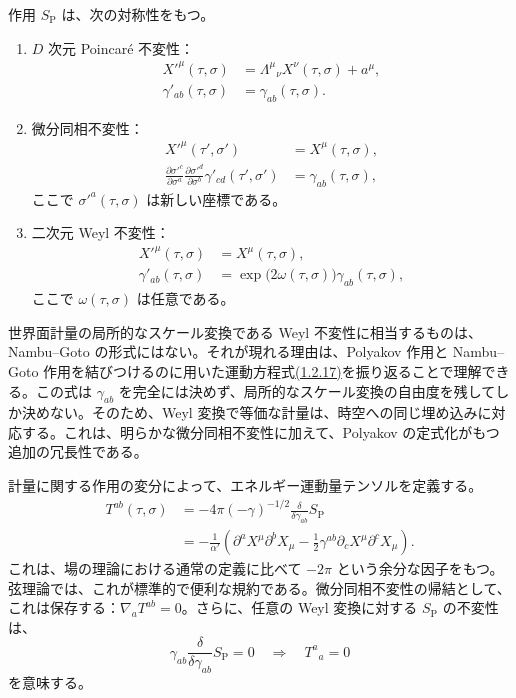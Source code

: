 作用 $S_{\mathrm P}$ は、次の対称性をもつ。
\begin{enumerate}
\item $D$ 次元 Poincaré 不変性：
\begin{equation}
\begin{aligned}
X'^\mu(\tau,\sigma)&=\Lambda^\mu{}_\nu X^\nu(\tau,\sigma)+a^\mu,\\
\gamma'_{ab}(\tau,\sigma)&=\gamma_{ab}(\tau,\sigma).
\end{aligned}
\tag{1.2.19}\label{eq:1.2.19}
\end{equation}
\item 微分同相不変性：
\begin{equation}
\begin{aligned}
X'^\mu(\tau',\sigma')&=X^\mu(\tau,\sigma),\\
\frac{\partial\sigma'^c}{\partial\sigma^a}
\frac{\partial\sigma'^d}{\partial\sigma^b}\gamma'_{cd}(\tau',\sigma')
&=\gamma_{ab}(\tau,\sigma),
\end{aligned}
\tag{1.2.20}\label{eq:1.2.20}
\end{equation}
ここで $\sigma'^a(\tau,\sigma)$ は新しい座標である。
\item 二次元 Weyl 不変性：
\begin{equation}
\begin{aligned}
X'^\mu(\tau,\sigma)&=X^\mu(\tau,\sigma),\\
\gamma'_{ab}(\tau,\sigma)&=\exp\bigl(2\omega(\tau,\sigma)\bigr)
\gamma_{ab}(\tau,\sigma),
\end{aligned}
\tag{1.2.21}\label{eq:1.2.21}
\end{equation}
ここで $\omega(\tau,\sigma)$ は任意である。
\end{enumerate}
世界面計量の局所的なスケール変換である Weyl 不変性に相当するものは、Nambu--Goto の形式にはない。それが現れる理由は、Polyakov 作用と Nambu--Goto 作用を結びつけるのに用いた運動方程式\hyperref[eq:1.2.17]{(1.2.17)}を振り返ることで理解できる。この式は $\gamma_{ab}$ を完全には決めず、局所的なスケール変換の自由度を残してしか決めない。そのため、Weyl 変換で等価な計量は、時空への同じ埋め込みに対応する。これは、明らかな微分同相不変性に加えて、Polyakov の定式化がもつ追加の冗長性である。

計量に関する作用の変分によって、エネルギー運動量テンソルを定義する。
\begin{equation}
\begin{aligned}
T^{ab}(\tau,\sigma)&=-4\pi(-\gamma)^{-1/2}
\frac{\delta}{\delta\gamma_{ab}}S_{\mathrm P}\\
&=-\frac{1}{\alpha'}\left(
\partial^aX^\mu\partial^bX_\mu
-\frac12\gamma^{ab}\partial_cX^\mu\partial^cX_\mu\right).
\end{aligned}
\tag{1.2.22}\label{eq:1.2.22}
\end{equation}
これは、場の理論における通常の定義に比べて $-2\pi$ という余分な因子をもつ。弦理論では、これが標準的で便利な規約である。微分同相不変性の帰結として、これは保存する：$\nabla_aT^{ab}=0$。さらに、任意の Weyl 変換に対する $S_{\mathrm P}$ の不変性は、
\begin{equation}
\gamma_{ab}\frac{\delta}{\delta\gamma_{ab}}S_{\mathrm P}=0
\quad\Rightarrow\quad T^a{}_a=0
\tag{1.2.23}\label{eq:1.2.23}
\end{equation}
を意味する。


